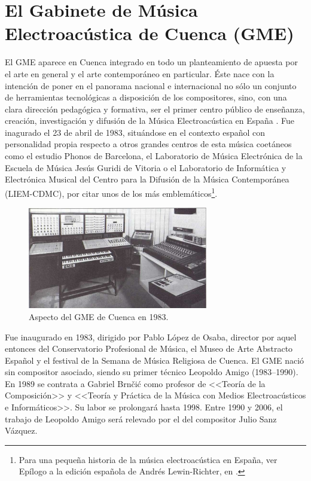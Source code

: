 \chapter{El Gabinete de Música Electroacústica de Cuenca (GME)}


El GME aparece en Cuenca integrado en todo un planteamiento de apuesta por el arte en general y el arte contemporáneo en particular. Éste nace con la intención de poner en el panorama nacional e internacional no sólo un conjunto de herramientas tecnológicas a disposición de los compositores, sino, con una clara dirección pedagógica y formativa, ser el primer centro público de enseñanza, creación, investigación y difusión de la Música Electroacústica en España \cite[p.~317]{GME}. Fue inagurado el 23 de abril de 1983, situándose en el contexto español con personalidad propia respecto a otros grandes centros de esta música coetáneos como el estudio Phonos de Barcelona, el Laboratorio de Música Electrónica de la Escuela de Música Jesús Guridi de Vitoria o el Laboratorio de Informática y Electrónica Musical del Centro para la Difusión de la Música Contemporánea (LIEM-CDMC), por citar unos de los más emblemáticos\footnote{Para una pequeña historia de la música electroacústica en España, ver Epílogo a la edición española de Andrés Lewin-Richter, en .}.

\begin{figure}
	\centering
	\includegraphics[width=0.7\textwidth]{GME_1984}
	\caption[Aspecto del GME de Cuenca en 1983.]{Aspecto del GME de Cuenca en 1983.}
	\label{fig:gme_1984}
\end{figure}

Fue inaugurado en 1983, dirigido por Pablo López de Osaba, director por aquel entonces del Conservatorio Profesional de Música, el Museo de Arte Abstracto Español y el festival de la Semana de Música Religiosa de Cuenca. El GME nació sin compositor asociado, siendo su primer técnico Leopoldo Amigo (1983--1990). En 1989 se contrata a Gabriel Brnčić como profesor de <<Teoría de la Composición>> y <<Teoría y Práctica de la Música con Medios Electroacústicos e Informáticos>>. Su labor se prolongará hasta 1998. Entre 1990 y 2006, el trabajo de Leopoldo Amigo será relevado por el del compositor Julio Sanz Vázquez. 

